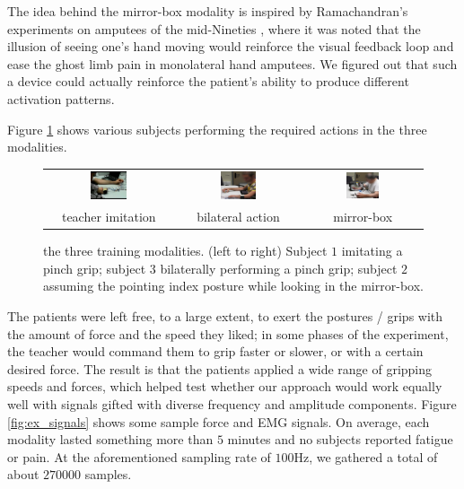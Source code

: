 The idea behind the mirror-box modality is inspired by Ramachandran's
experiments on amputees of the mid-Nineties \cite{ramachandran}, where
it was noted that the illusion of seeing one's hand moving would
reinforce the visual feedback loop and ease the ghost limb pain in
monolateral hand amputees. We figured out that such a device could
actually reinforce the patient's ability to produce different
activation patterns.

Figure \ref{fig:modalities} shows various subjects performing the
required actions in the three modalities.

\begin{figure}[!ht] \centering
  \begin{tabular}{ccc}
    \includegraphics[width=0.3\textwidth]{figs/mod1} &
    \includegraphics[width=0.3\textwidth]{figs/mod2} &
    \includegraphics[width=0.3\textwidth]{figs/mod3} \\
    teacher imitation & bilateral action & mirror-box \\
  \end{tabular}
  \caption{the three training modalities. (left to right) Subject $1$
    imitating a pinch grip; subject $3$ bilaterally performing a pinch
    grip; subject $2$ assuming the pointing index posture while
    looking in the mirror-box.}
  \label{fig:modalities}
\end{figure}

The patients were left free, to a large extent, to exert the postures
/ grips with the amount of force and the speed they liked; in some
phases of the experiment, the teacher would command them to grip
faster or slower, or with a certain desired force. The result is that
the patients applied a wide range of gripping speeds and forces, which
helped test whether our approach would work equally well with signals
gifted with diverse frequency and amplitude components. Figure
\ref{fig:ex_signals} shows some sample force and EMG signals. On
average, each modality lasted something more than $5$ minutes and no
subjects reported fatigue or pain. At the aforementioned sampling rate
of $100$Hz, we gathered a total of about $270000$ samples.

